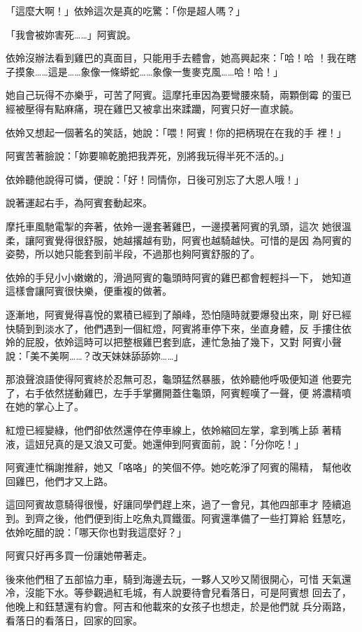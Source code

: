「這麼大啊！」依姈這次是真的吃驚：「你是超人嗎？」

「我會被妳害死……」阿賓說。

依姈沒辦法看到雞巴的真面目，只能用手去體會，她高興起來：「哈！哈
！我在瞎子摸象……這是……象像一條蟒蛇……象像一隻麥克風……哈！哈！」

她自己玩得不亦樂乎，可苦了阿賓。這摩托車因為要彎腰來騎，兩顆倒霉
的蛋已經被壓得有點麻痛，現在雞巴又被拿出來蹂躪，阿賓只好一直求饒。

依姈又想起一個著名的笑話，她說：「喂！阿賓！你的把柄現在在我的手
裡！」

阿賓苦著臉說：「妳要嘛乾脆把我弄死，別將我玩得半死不活的。」

依姈聽他說得可憐，便說：「好！同情你，日後可別忘了大恩人哦！」

說著運起右手，為阿賓套動起來。

摩托車風馳電掣的奔著，依姈一邊套著雞巴，一邊摸著阿賓的乳頭，這次
她很溫柔，讓阿賓覺得很舒服，她越撂越有勁，阿賓也越騎越快。可惜的是因
為阿賓的姿勢，所以她只能套到前半段，不過那也夠阿賓舒服的了。

依姈的手兒小小嫩嫩的，滑過阿賓的龜頭時阿賓的雞巴都會輕輕抖一下，
她知道這樣會讓阿賓很快樂，便重複的做著。

逐漸地，阿賓覺得喜悅的累積已經到了顛峰，恐怕隨時就要爆發出來，剛
好已經快騎到到淡水了，他們遇到一個紅燈，阿賓將車停下來，坐直身體，反
手摟住依姈的屁股，依姈這時可以把整根雞巴套到底，連忙急抽了幾下，又對
阿賓小聲說：「美不美啊……？改天妹妹舔舔妳……」

那浪聲浪語使得阿賓終於忍無可忍，龜頭猛然暴脹，依姈聽他呼吸便知道
他要完了，右手依然搓動雞巴，左手手掌攤開蓋住龜頭，阿賓輕嘆了一聲，便
將濃精噴在她的掌心上了。

紅燈已經變綠，他們卻依然還停在停車線上，依姈縮回左掌，拿到嘴上舔
著精液，這妞兒真的是又浪又可愛。她還伸到阿賓面前，說：「分你吃！」

阿賓連忙稱謝推辭，她又「咯咯」的笑個不停。她吃乾淨了阿賓的陽精，
幫他收回雞巴，他們才又上路。

這回阿賓故意騎得很慢，好讓同學們趕上來，過了一會兒，其他四部車才
陸續追到。到齊之後，他們便到街上吃魚丸買鐵蛋。阿賓還準備了一些打算給
鈺慧吃，依姈吃醋的說：「哪天你也對我這麼好？」

阿賓只好再多買一份讓她帶著走。

後來他們租了五部協力車，騎到海邊去玩，一夥人又吵又鬧很開心，可惜
天氣還冷，沒能下水。等參觀過紅毛城，有人說要待會兒看落日，可是阿賓想
回去了，他晚上和鈺慧還有約會。阿吉和他載來的女孩子也想走，於是他們就
兵分兩路，看落日的看落日，回家的回家。

